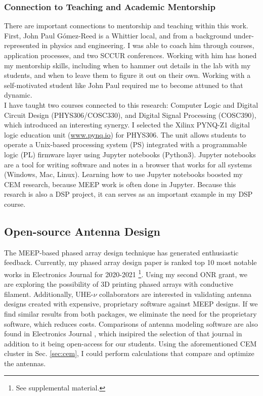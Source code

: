 \documentclass[../../../main.tex]{subfiles}
\begin{document}
\subsubsection{Connection to Teaching and Academic Mentorship}

There are important connections to mentorship and teaching within this work.  First, John Paul G\'{o}mez-Reed is a Whittier local, and from a background under-represented in physics and engineering.  I was able to coach him through courses, application processes, and two SCCUR conferences.  Working with him has honed my mentorship skills, including when to hammer out details in the lab with my students, and when to leave them to figure it out on their own.  Working with a self-motivated student like John Paul required me to become attuned to that dynamic.
\\
\vspace{0.15cm}
I have taught two courses connected to this research: Computer Logic and Digital Circuit Design (PHYS306/COSC330), and Digital Signal Processing (COSC390), which introduced an interesting synergy.  I selected the Xilinx PYNQ-Z1 digital logic education unit (\url{www.pynq.io}) for PHYS306.  The unit allows students to operate a Unix-based processing system (PS) integrated with a programmable logic (PL) firmware layer using Jupyter notebooks (Python3).  Jupyter notebooks are a tool for writing software and notes in a browser that works for all systems (Windows, Mac, Linux).  Learning how to use Jupyter notebooks boosted my CEM research, because MEEP work is often done in Jupyter.  Because this resarch is also a DSP project, it can serves as an important example in my DSP course.

\subsection{Open-source Antenna Design}

The MEEP-based phased array design technique has generated enthusiastic feedback.  Currently, my phased array design paper is ranked top 10 most notable works in Electronics Journal for 2020-2021 \cite{electronics10040415}\footnote{See supplemental material.}.  Using my second ONR grant, we are exploring the possibility of 3D printing phased arrays with conductive filament.  Additionally, UHE-$\nu$ collaborators are interested in validating antenna designs created with expensive, proprietary software against MEEP designs.  If we find similar results from both packages, we eliminate the need for the proprietary software, which reduces costs.  Comparisons of antenna modeling software are also found in Electronics Journal \cite{10.3390/electronics8121506}, which insipired the selection of that journal in addition to it being open-access for our students.  Using the aforementioned CEM cluster in Sec. \ref{sec:cem}, I could perform calculations that compare and optimize the antennas.
\end{document}
